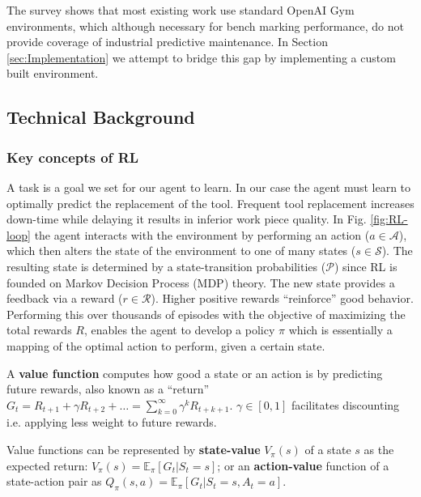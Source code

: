 \documentclass[a4paper, 12pt]{article}
\begin{document}
The survey shows that most existing work use standard OpenAI Gym environments, which although necessary for bench marking performance, do not provide coverage of industrial predictive maintenance. In Section \ref{sec:Implementation} we attempt to bridge this gap by implementing a custom built environment.

\subsection{Technical Background}

\subsubsection*{Key concepts of RL}
A task is a goal we set for our agent to learn. In our case the agent must learn to optimally predict the replacement of the tool. Frequent tool replacement increases down-time while delaying it results in inferior work piece quality. In Fig. \ref{fig:RL-loop} the agent interacts with the environment by performing an action ($a \in \mathcal{A}$), which then alters the state of the environment to one of many states ($s \in \mathcal{S}$). The resulting state is determined by a state-transition probabilities ($\mathcal{P}$) since RL is founded on Markov Decision Process (MDP) theory. The new state provides a feedback via a reward ($r \in \mathcal{R}$). Higher positive rewards ``reinforce'' good behavior. Performing this over thousands of episodes with the objective of maximizing the total rewards $R$, enables the agent to develop a policy $\pi$ which is essentially a mapping of the optimal action to perform, given a certain state.

A \textbf{value function} computes how good a state or an action is by predicting future rewards, also known as a ``return'' $G_t = R_{t+1} + \gamma R_{t+2} + \dots = \sum_{k=0}^{\infty} \gamma^k R_{t+k+1}$. $\gamma \in [0, 1]$ facilitates discounting i.e. applying less weight to future rewards. 

Value functions can be represented by \textbf{state-value} $V_{\pi}(s)$ of a state $s$ as the expected return: $V_{\pi}(s) = \mathbb{E}_{\pi}[G_t \vert S_t = s]$; or an \textbf{action-value} function of a state-action pair as $Q_{\pi}(s, a) = \mathbb{E}_{\pi}[G_t \vert S_t = s, A_t = a]$.


\end{document}
